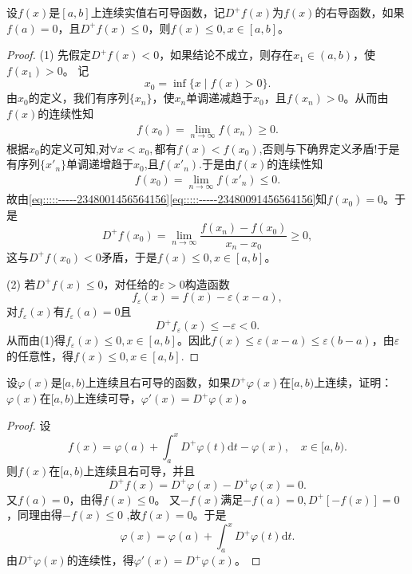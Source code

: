 \documentclass[../../main.tex]{subfiles}%
\begin{document}
\begin{proposition}\label{proposition:右导数小于等于0函数值小于端点值}
设\( f(x) \)是\([a,b]\)上连续实值右可导函数，记\( D^+f(x) \)为\( f(x) \)的右导函数，如果\( f(a)=0 \)，且\( D^+f(x) \leqslant0 \)，则\( f(x) \leqslant0, x \in [a,b] \)。
\end{proposition}
\begin{proof}
(1) 先假定\( D^+f(x) < 0 \)，如果结论不成立，则存在\( x_1 \in (a,b) \)，使\( f(x_1) > 0 \)。
记
\[
x_0 = \inf\{ x \mid f(x) > 0 \}.
\]
由\( x_0 \)的定义，我们有序列\(\{ x_n \}\)，使\( x_n \)单调递减趋于\( x_0 \)，且\( f(x_n) > 0 \)。从而由\( f(x) \)的连续性知
\begin{align}
f\left( x_0 \right)=\underset{n\rightarrow \infty}{\lim}f\left( x_n \right) \geqslant 0.\label{eq:::::-----2348001456564156}
\end{align}
根据$x_0$的定义可知,对$\forall x<x_0,$都有$f(x)<f(x_0)$,否则与下确界定义矛盾!于是有序列$\{x'_n\}$单调递增趋于$x_0$,且$f(x'_n).$于是由\( f(x) \)的连续性知
\begin{align}
f\left( x_0 \right)=\underset{n\rightarrow \infty}{\lim}f\left( x'_n \right)  \leqslant 0.\label{eq:::::-----23480091456564156}
\end{align}
故由\eqref{eq:::::-----2348001456564156}\eqref{eq:::::-----23480091456564156}知\( f(x_0)=0 \)。于是
\[
D^+f(x_0) = \lim_{n \to \infty} \frac{f(x_n) - f(x_0)}{x_n - x_0} \geqslant 0,
\]
这与\( D^+f(x_0) < 0 \)矛盾，于是\( f(x) \leqslant 0, x \in [a,b] \)。

(2) 若\( D^+f(x) \leqslant 0 \)，对任给的\( \varepsilon > 0 \)构造函数
\[
f_\varepsilon(x) = f(x) - \varepsilon(x - a),
\]
对\( f_\varepsilon(x) \)有\( f_\varepsilon(a)=0 \)且
\[
D^+f_\varepsilon(x) \leqslant-\varepsilon < 0.
\]
从而由(1)得\( f_\varepsilon(x) \leqslant0, x \in [a,b] \)。因此\( f(x) \leqslant\varepsilon(x - a)\leqslant \varepsilon (b-a) \)，由\( \varepsilon \)的任意性，得\( f(x) \leqslant0, x \in [a,b] \).
\end{proof}

\begin{example}
设\( \varphi(x) \)是\([a,b)\)上连续且右可导的函数，如果\( D^+\varphi(x) \)在\([a,b)\)上连续，证明：\( \varphi(x) \)在\([a,b)\)上连续可导，\( \varphi'(x)=D^+\varphi(x) \)。
\end{example}
\begin{proof}
设
\[
f(x) = \varphi(a) + \int_a^x D^+\varphi(t)\mathrm{d}t - \varphi(x), \quad x \in [a,b).
\]
则\( f(x) \)在\([a,b)\)上连续且右可导，并且
\[
D^+f(x) = D^+\varphi(x) - D^+\varphi(x) = 0.
\]
又\( f(a)=0 \)，由得\( f(x) \leqslant0 \)。
又\(-f(x)\)满足\(-f(a)=0, D^+[-f(x)] = 0\)，同理由得\(-f(x) \leqslant0\) ,故\(f(x)=0\)。于是
\[
\varphi(x) = \varphi(a) + \int_a^x D^+\varphi(t)\mathrm{d}t.
\]
由\( D^+\varphi(x) \)的连续性，得\( \varphi'(x)=D^+\varphi(x) \)。
\end{proof}
\end{document}
